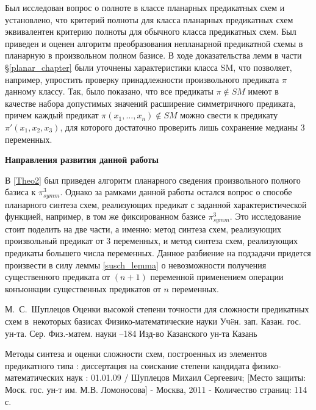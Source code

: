 \documentclass[12pt]{article}
\begin{document}
Был исследован вопрос о полноте в классе планарных предикатных схем и установлено, что 
критерий полноты для класса планарных предикатных схем эквивалентен критерию полноты для обычного
класса предикатных схем. Был приведен и оценен алгоритм преобразования непланарной предикатной схемы в планарную 
в произвольном полном базисе. 
В ходе доказательства лемм в части \S \ref{planar_chapter} были уточнены характеристики класса SM, что 
позволяет, например, упростить проверку принадлежности произвольного предиката $\pi$ данному классу. 
Так, было показано, что все предикаты $\pi \notin SM$ имеют в качестве набора допустимых значений расширение симметричного
предиката, причем каждый предикат $\pi(x_1, \dots, x_n) \notin SM$ можно свести к предикату $\pi'(x_1, x_2, x_3)$, 
для которого достаточно проверить лишь сохранение медианы 3 переменных.

\textbf{Направления развития данной работы}

В \ref{Theo2} был приведен алгоритм планарного сведения произвольного полного базиса к $\pi_{symm}^3$.
Однако за рамками данной работы остался вопрос о способе планарного синтеза схем, реализующих предикат 
с заданной характеристической функцией, например, в том же фиксированном базисе $\pi_{symm}^3$. 
Это исследование стоит поделить на две части, а именно: 
метод синтеза схем, реализующих произвольный предикат от 3 переменных, и метод синтеза схем, реализующих предикаты
большего числа переменных. Данное разбиение на подзадачи придется произвести в силу леммы \ref{susch_lemma} 
о невозможности получения 
существенного предиката от $(n+1)$ переменной применением операции конъюнкции существенных предикатов от $n$ переменных.

\clearpage
{}
    \by М.~С.~Шуплецов
    \paper Оценки высокой степени точности для сложности предикатных схем в~некоторых базисах
    \inbook Физико-математические науки
    \serial Уч\"eн. зап. Казан. гос. ун-та. Сер. Физ.-матем. науки
    --184
    \publ Изд-во Казанского ун-та
    \publaddr Казань

Методы синтеза и оценки сложности схем, построенных из элементов предикатного типа : 
диссертация на соискание степени кандидата физико-математических наук : 01.01.09 / Шуплецов Михаил Сергеевич; 
[Место защиты: Моск. гос. ун-т им. М.В. Ломоносова] - Москва, 2011 - Количество страниц: 114 с.
\end{document}
